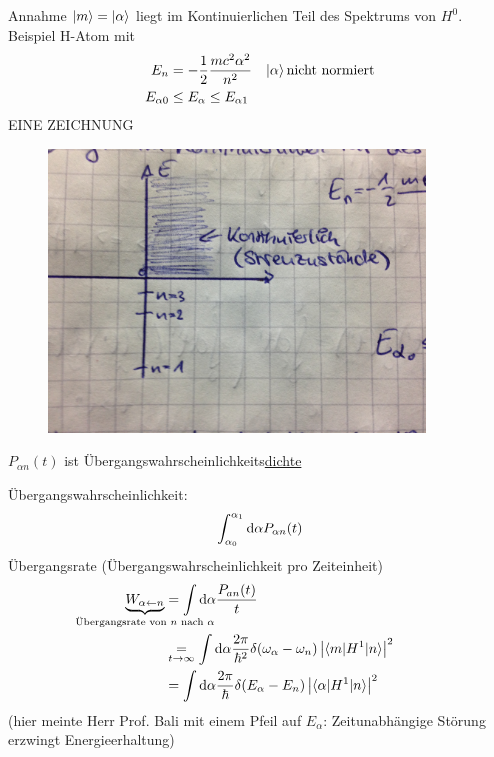 	Annahme $\ket{m} = \ket{\alpha}$ liegt im Kontinuierlichen Teil des Spektrums von $H^0$. Beispiel H-Atom mit
		\begin{align*}
			E_n &= - \frac{1}{2} \frac{m c^2 \alpha^2}{n^2} &
			\ket{\alpha} \text{nicht normiert} \\
			E_{\alpha 0} &\leq E_\alpha \leq E_{\alpha 1}
		\end{align*}
	EINE ZEICHNUNG
	\begin{figure} [h]
		\begin{center}
			\includegraphics[width=10cm]{Ersatzgraph2.jpg}
		\end{center}
	\end{figure}

	$P_{\alpha n}(t)$ ist Übergangswahrscheinlichkeits\underline{dichte}
	
	Übergangswahrscheinlichkeit: 
		\begin{equation*}
			\int_{\alpha_0}^{\alpha_1} \mathrm{d} \alpha P_{\alpha n} (t)
		\end{equation*}
	Übergangsrate (Übergangswahrscheinlichkeit pro Zeiteinheit)
		\begin{align*}
			\underbrace{W_{\alpha \leftarrow n}}_{
				\mathclap{\text{Übergangsrate von~} n \text{~nach~} \alpha}}
			&= \int \diff \alpha \frac{P_{an}(t)}{t} \\
			&\underset{t \rightarrow \infty}{=} 
			\int \diff \alpha \frac{2 \pi}{\hbar^2} 
			\delta(\omega_\alpha - \omega_n) \left| \braket{m | H^1 | n}\right|^2 \\
			&= \int \diff \alpha \frac{2 \pi}{\hbar} 
			\delta (E_\alpha - E_n) \left| \braket{\alpha | H^1 | n}\right|^2
		\end{align*}
	(hier meinte Herr Prof. Bali mit einem Pfeil auf $E_\alpha$: Zeitunabhängige Störung erzwingt Energieerhaltung)
	
